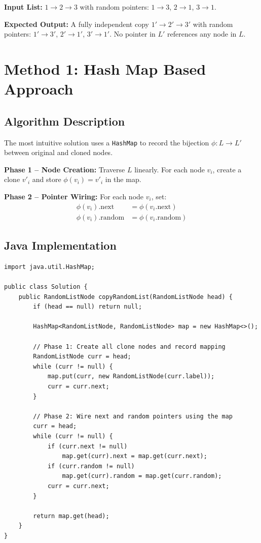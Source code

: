 \documentclass[10pt,journal,compsoc]{IEEEtran}
\begin{document}
\textbf{Input List:} $1 \rightarrow 2 \rightarrow 3$ with random pointers: $1 \rightarrow 3$, $2 \rightarrow 1$, $3 \rightarrow 1$.

\textbf{Expected Output:} A fully independent copy $1' \rightarrow 2' \rightarrow 3'$ with random pointers: $1' \rightarrow 3'$, $2' \rightarrow 1'$, $3' \rightarrow 1'$. No pointer in $L'$ references any node in $L$.

\section{Method 1: Hash Map Based Approach}
\subsection{Algorithm Description}

The most intuitive solution uses a \texttt{HashMap} to record the bijection $\phi: L \rightarrow L'$ between original and cloned nodes.

\textbf{Phase 1 -- Node Creation:} Traverse $L$ linearly. For each node $v_i$, create a clone $v'_i$ and store $\phi(v_i) = v'_i$ in the map.

\textbf{Phase 2 -- Pointer Wiring:} For each node $v_i$, set:
\begin{align}
    \phi(v_i).\text{next}   &= \phi(v_i.\text{next}) \\
    \phi(v_i).\text{random} &= \phi(v_i.\text{random})
\end{align}

\subsection{Java Implementation}

\begin{verbatim}
import java.util.HashMap;

public class Solution {
    public RandomListNode copyRandomList(RandomListNode head) {
        if (head == null) return null;

        HashMap<RandomListNode, RandomListNode> map = new HashMap<>();

        // Phase 1: Create all clone nodes and record mapping
        RandomListNode curr = head;
        while (curr != null) {
            map.put(curr, new RandomListNode(curr.label));
            curr = curr.next;
        }

        // Phase 2: Wire next and random pointers using the map
        curr = head;
        while (curr != null) {
            if (curr.next != null)
                map.get(curr).next = map.get(curr.next);
            if (curr.random != null)
                map.get(curr).random = map.get(curr.random);
            curr = curr.next;
        }

        return map.get(head);
    }
}
\end{verbatim}
\end{document}
